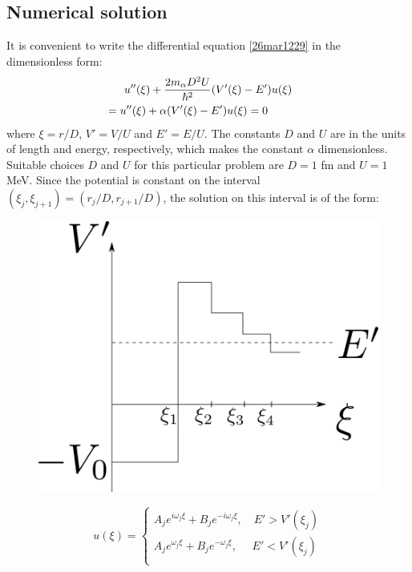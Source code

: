 \documentclass[twocolumn]{article}
\begin{document}
\begin{large}
\subsection*{Numerical solution}
It is convenient to write the differential equation \eqref{26mar1229} in the dimensionless form: 
\begin{equation}
    \label{26mar1412}
    \begin{split}
        &u''(\xi) + \frac{2m_\alpha D^2U}{\hbar^2}(V'(\xi)-E')u(\xi) \\ 
        &\hspace{-0.6cm}=  u''(\xi) + \alpha(V'(\xi)-E')u(\xi) = 0 
    \end{split}
\end{equation}
where $\xi=r/D$, $V'=V/U$ and $E'=E/U$. The constants $D$ and $U$ are in the units of length and energy, respectively, which makes the constant $\alpha$ dimensionless. Suitable choices $D$ and $U$ for this particular problem are $D=1$ fm and $U=1$ MeV. Since the potential is constant on the interval $(\xi_j,\xi_{j+1}) = (r_j/D,r_{j+1}/D)$, the solution on this interval is of the form:
\begin{figure}
    \centering
    \includegraphics[scale=0.5]{setup.png}
\end{figure}
\begin{equation*}
    u(\xi) = 
    \begin{cases}
        A_je^{i\omega_j\xi}+B_je^{-i\omega_j\xi},\quad E'>V'(\xi_j) \\ 
        A_je^{\omega_j\xi}+B_je^{-\omega_j\xi},\quad\,\, E'<V'(\xi_j) \\ 
    \end{cases}

\end{equation*}
\end{large}
\end{document}
